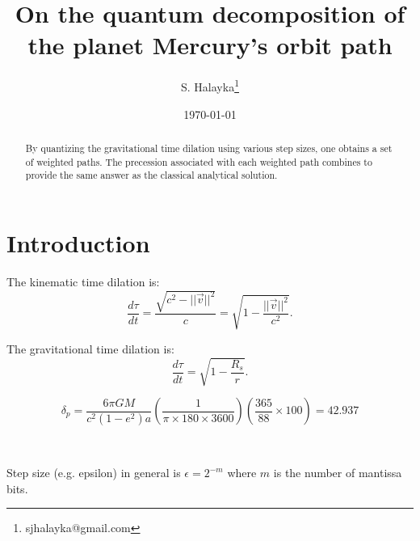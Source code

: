 \documentclass[12pt]{article}
\title{On the quantum decomposition of the planet Mercury's orbit path}
\author{S. Halayka\footnote{sjhalayka@gmail.com}}
\date{\today\;\currenttime}
\begin{document}
 
\maketitle

\begin{abstract}
By quantizing the gravitational time dilation using various step sizes, one obtains a set of weighted paths.
The precession associated with each weighted path combines to provide the same answer as the classical analytical solution.
\end{abstract}


\section{Introduction}

The kinematic time dilation is:
\begin{equation}
\label{eq_intro_kinematic}
\frac{d\tau}{dt} = \frac{\sqrt{c^2 - \lvert\lvert \vec{v}\rvert\rvert^2}}{c} = \sqrt{1 - \frac{\lvert\lvert \vec{v}\rvert\rvert^2}{c^2}}.
\end{equation}

The gravitational time dilation is:
\begin{equation}
\label{eq_intro_gravitational}
\frac{d\tau}{dt} = \sqrt{1 - \frac{R_s}{r}}.
\end{equation}



\begin{equation}
\label{delta_p}
\delta_{p} = \frac{6 \pi G M}{c^2 (1 - e^2) a} \left( \frac{1}{ \pi \times 180 \times 3600} \right) \left( \frac{365}{88} \times 100 \right) = 42.937
\end{equation}




\





Step size (e.g. epsilon) in general is $\epsilon = 2^{-m}$ where $m$ is the number of mantissa bits.
\end{document}
